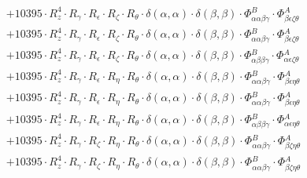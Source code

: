 \documentclass{article}
\begin{document}
\begin{subequations}
\begin{gather}
\begin{array}{c}
 \\[0.2em] 		 + 10395 \cdot R_{z}^{4} \cdot R_{\gamma{}} \cdot R_{\epsilon{}} \cdot R_{\zeta{}} \cdot R_{\theta{}} \cdot \delta{}\left(\alpha{}, \alpha{}\right) \cdot \delta{}\left(\beta{}, \beta{}\right) \cdot \Phi{}^{B}_{\alpha{}\alpha{}\beta{}\gamma{}} \cdot \Phi{}^{A}_{\beta{}\epsilon{}\zeta{}\theta{}} 
 \\[0.2em] 		 + 10395 \cdot R_{z}^{4} \cdot R_{\gamma{}} \cdot R_{\epsilon{}} \cdot R_{\zeta{}} \cdot R_{\theta{}} \cdot \delta{}\left(\alpha{}, \alpha{}\right) \cdot \delta{}\left(\beta{}, \beta{}\right) \cdot \Phi{}^{B}_{\alpha{}\alpha{}\beta{}\gamma{}} \cdot \Phi{}^{A}_{\beta{}\epsilon{}\zeta{}\theta{}} 
 \\[0.2em] 		 + 10395 \cdot R_{z}^{4} \cdot R_{\gamma{}} \cdot R_{\epsilon{}} \cdot R_{\zeta{}} \cdot R_{\theta{}} \cdot \delta{}\left(\alpha{}, \alpha{}\right) \cdot \delta{}\left(\beta{}, \beta{}\right) \cdot \Phi{}^{B}_{\alpha{}\beta{}\beta{}\gamma{}} \cdot \Phi{}^{A}_{\alpha{}\epsilon{}\zeta{}\theta{}} 
 \\[0.2em] 		 + 10395 \cdot R_{z}^{4} \cdot R_{\gamma{}} \cdot R_{\epsilon{}} \cdot R_{\eta{}} \cdot R_{\theta{}} \cdot \delta{}\left(\alpha{}, \alpha{}\right) \cdot \delta{}\left(\beta{}, \beta{}\right) \cdot \Phi{}^{B}_{\alpha{}\alpha{}\beta{}\gamma{}} \cdot \Phi{}^{A}_{\beta{}\epsilon{}\eta{}\theta{}} 
 \\[0.2em] 		 + 10395 \cdot R_{z}^{4} \cdot R_{\gamma{}} \cdot R_{\epsilon{}} \cdot R_{\eta{}} \cdot R_{\theta{}} \cdot \delta{}\left(\alpha{}, \alpha{}\right) \cdot \delta{}\left(\beta{}, \beta{}\right) \cdot \Phi{}^{B}_{\alpha{}\alpha{}\beta{}\gamma{}} \cdot \Phi{}^{A}_{\beta{}\epsilon{}\eta{}\theta{}} 
 \\[0.2em] 		 + 10395 \cdot R_{z}^{4} \cdot R_{\gamma{}} \cdot R_{\epsilon{}} \cdot R_{\eta{}} \cdot R_{\theta{}} \cdot \delta{}\left(\alpha{}, \alpha{}\right) \cdot \delta{}\left(\beta{}, \beta{}\right) \cdot \Phi{}^{B}_{\alpha{}\beta{}\beta{}\gamma{}} \cdot \Phi{}^{A}_{\alpha{}\epsilon{}\eta{}\theta{}} 
 \\[0.2em] 		 + 10395 \cdot R_{z}^{4} \cdot R_{\gamma{}} \cdot R_{\zeta{}} \cdot R_{\eta{}} \cdot R_{\theta{}} \cdot \delta{}\left(\alpha{}, \alpha{}\right) \cdot \delta{}\left(\beta{}, \beta{}\right) \cdot \Phi{}^{B}_{\alpha{}\alpha{}\beta{}\gamma{}} \cdot \Phi{}^{A}_{\beta{}\zeta{}\eta{}\theta{}} 
 \\[0.2em] 		 + 10395 \cdot R_{z}^{4} \cdot R_{\gamma{}} \cdot R_{\zeta{}} \cdot R_{\eta{}} \cdot R_{\theta{}} \cdot \delta{}\left(\alpha{}, \alpha{}\right) \cdot \delta{}\left(\beta{}, \beta{}\right) \cdot \Phi{}^{B}_{\alpha{}\alpha{}\beta{}\gamma{}} \cdot \Phi{}^{A}_{\beta{}\zeta{}\eta{}\theta{}} 

\end{array}
\end{gather}
\end{subequations}
\end{document}
